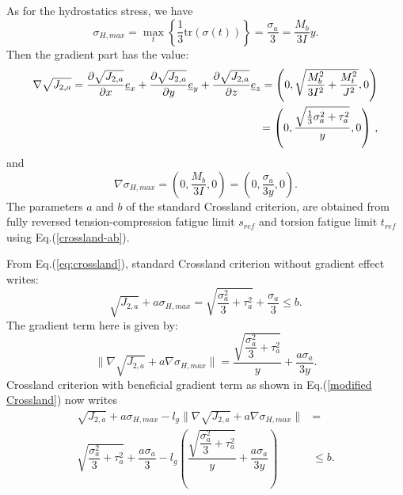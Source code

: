 As for the  hydrostatics stress, we have
\begin{equation}
	\sigma_{H,max}=\max\limits_{t}\left\lbrace \dfrac{1}{3}\textrm{tr}(\sigma(t))\right\rbrace =\dfrac{\sigma_{a}}{3}=\dfrac{M_b}{3I}y .
\end{equation}
Then the gradient part has the value:
\begin{equation}
	\begin{split}
		\nabla\sqrt{J_{2,a}}=\dfrac{\partial\sqrt{J_{2,a}}}{\partial x}\uline{e}_x+\dfrac{\partial\sqrt{J_{2,a}}}{\partial y}\uline{e}_y+\dfrac{\partial\sqrt{J_{2,a}}}{\partial z}\uline{e}_z=\left( 0,\sqrt{\dfrac{M_b^2}{3I^2}+\dfrac{M_t^2}{J^2}},0\right) \\=\left( 0,\dfrac{\sqrt{\frac{1}{3}\sigma_a^2+\tau_a^2}}{y},0\right) \, ,
	\end{split}
\end{equation}
and
\begin{equation}
	\nabla \sigma_{H,max}=\left( 0,\dfrac{M_b}{3I},0\right) =\left( 0,\dfrac{\sigma_a}{3y},0\right) .
\end{equation}
The parameters $a$ and $b$ of the standard Crossland criterion, are obtained from fully reversed tension-compression fatigue limit $s_{ref}$  and torsion fatigue limit $t_{ref}$ using Eq.(\ref{crossland-ab}).

\noindent From Eq.(\ref{eq:crossland}), standard Crossland criterion without gradient effect writes:
\begin{equation}
	\sqrt{J_{2,a}}+a\sigma_{H,max}=\sqrt{\dfrac{\sigma_a^2}{3}+\tau_a^2}+\dfrac{\sigma_a}{3}\leqslant b.
	\label{eqrbcross}
\end{equation}
The gradient term here is given by:
\begin{equation}
	\parallel{\nabla\sqrt{J_{2,a}}}+a{\nabla \sigma_{H,max}}\parallel= \dfrac{\sqrt{\dfrac{\sigma_a^2}{3}+\tau_a^2}}{y}+\dfrac{a\sigma_a}{3y}.
\end{equation}
Crossland criterion with beneficial gradient term as shown in Eq.(\ref{modified Crossland}) now writes
\begin{equation}
	\begin{split}
		\sqrt{J_{2,a}}+a\sigma_{H,max}-l_g\parallel{\nabla\sqrt{J_{2,a}}}+a\nabla{\sigma_{H,max}}\parallel&=\\\sqrt{\dfrac{\sigma_a^2}{3}+\tau_a^2}+\dfrac{a\sigma_a}{3}-l_g\left( \dfrac{\sqrt{\dfrac{\sigma_a^2}{3}+\tau_a^2}}{y}+\dfrac{a\sigma_a}{3y}\right) &\leqslant b.
	\end{split}
	\label{eq.arcblack}
\end{equation}
